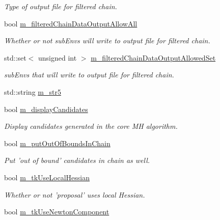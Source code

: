 \begin{DoxyCompactItemize}
\begin{DoxyCompactList}\small\item\em Type of output file for filtered chain. \end{DoxyCompactList}\item 
bool \hyperlink{class_q_u_e_s_o_1_1_m_l_sampling_level_options_a80471ba2c70d39f2cb7e1ea954fb86b8}{m\-\_\-filtered\-Chain\-Data\-Output\-Allow\-All}
\begin{DoxyCompactList}\small\item\em Whether or not sub\-Envs will write to output file for filtered chain. \end{DoxyCompactList}\item 
std\-::set$<$ unsigned int $>$ \hyperlink{class_q_u_e_s_o_1_1_m_l_sampling_level_options_a12bf1b2424e791608d3dcd1254c3eef2}{m\-\_\-filtered\-Chain\-Data\-Output\-Allowed\-Set}
\begin{DoxyCompactList}\small\item\em sub\-Envs that will write to output file for filtered chain. \end{DoxyCompactList}\item 
std\-::string \hyperlink{class_q_u_e_s_o_1_1_m_l_sampling_level_options_a341ed1186366d5483559298a8c5348d2}{m\-\_\-str5}
\item 
bool \hyperlink{class_q_u_e_s_o_1_1_m_l_sampling_level_options_a975a24a45096ac07b8e3a6cade590bbc}{m\-\_\-display\-Candidates}
\begin{DoxyCompactList}\small\item\em Display candidates generated in the core M\-H algorithm. \end{DoxyCompactList}\item 
bool \hyperlink{class_q_u_e_s_o_1_1_m_l_sampling_level_options_acf244c6ea5d1ac9c61d19d1d8f24fd8c}{m\-\_\-put\-Out\-Of\-Bounds\-In\-Chain}
\begin{DoxyCompactList}\small\item\em Put 'out of bound' candidates in chain as well. \end{DoxyCompactList}\item 
bool \hyperlink{class_q_u_e_s_o_1_1_m_l_sampling_level_options_a981084edf651ff9db5dd56a36ef54a61}{m\-\_\-tk\-Use\-Local\-Hessian}
\begin{DoxyCompactList}\small\item\em Whether or not 'proposal' uses local Hessian. \end{DoxyCompactList}\item 
bool \hyperlink{class_q_u_e_s_o_1_1_m_l_sampling_level_options_aa763d458ffbb83ea5be881e9535a2cb5}{m\-\_\-tk\-Use\-Newton\-Component}

\end{DoxyCompactItemize}
